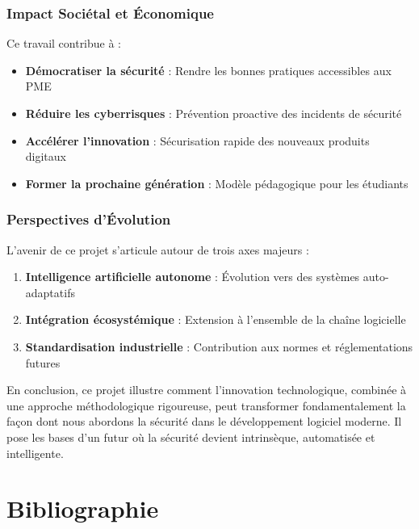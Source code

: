 \documentclass[12pt,a4paper]{report}
\begin{document}
\subsection{Impact Sociétal et Économique}

Ce travail contribue à :
\begin{itemize}
    \item \textbf{Démocratiser la sécurité} : Rendre les bonnes pratiques accessibles aux PME
    \item \textbf{Réduire les cyberrisques} : Prévention proactive des incidents de sécurité
    \item \textbf{Accélérer l'innovation} : Sécurisation rapide des nouveaux produits digitaux
    \item \textbf{Former la prochaine génération} : Modèle pédagogique pour les étudiants
\end{itemize}

\subsection{Perspectives d'Évolution}

L'avenir de ce projet s'articule autour de trois axes majeurs :

\begin{enumerate}
    \item \textbf{Intelligence artificielle autonome} : Évolution vers des systèmes auto-adaptatifs
    \item \textbf{Intégration écosystémique} : Extension à l'ensemble de la chaîne logicielle
    \item \textbf{Standardisation industrielle} : Contribution aux normes et réglementations futures
\end{enumerate}

En conclusion, ce projet illustre comment l'innovation technologique, combinée à une approche méthodologique rigoureuse, peut transformer fondamentalement la façon dont nous abordons la sécurité dans le développement logiciel moderne. Il pose les bases d'un futur où la sécurité devient intrinsèque, automatisée et intelligente.

\newpage

\chapter*{Bibliographie}
\end{document}
